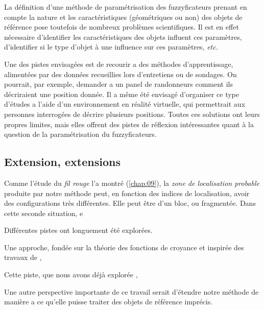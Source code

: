 La définition d'une méthode de paramétrisation des fuzzyficateurs
prenant en compte la nature et les caractéristiques (géométriques ou
non) des objets de référence pose toutefois de nombreux problèmes
scientifiques. Il est en effet nécessaire d'identifier les
caractéristiques des objets influent ces paramètres, d'identifier si
le type d'objet à une influence sur ces paramètres, \emph{etc.}

Une des pistes envisagées est de recourir a des méthodes
d'apprentissage, alimentées par des données recueillies lors
d'entretiens ou de sondages. On pourrait, par exemple, demander a un
panel de randonneurs comment ils décriraient une position donnée. Il a
même été envisagé d'organiser ce type d'études a l'aide d'un
environnement en réalité virtuelle, qui permettrait aux personnes
interrogées de décrire plusieurs positions. Toutes ces solutions ont
leurs propres limites, mais elles offrent des pistes de réflexion
intéressantes quant à la question de la paramétrisation du
fuzzyficateurs.

\subsection*{Extension, extensions}


Comme l'étude du \emph{fil rouge} l'a montré (\autoref{chap:09}), la
\emph{zone de localisation probable} produite par notre méthode peut,
en fonction des indices de localisation, avoir des configurations très
différentes. Elle peut être d'un bloc, ou fragmentée. Dans cette
seconde situation,  e


Différentes pistes ont longuement été explorées.

Une approche, fondée sur la théorie des fonctions de croyance
\autocite{Shafer1976} et inspirée des travaux de
\textcite{Olteanu2008},



Cette piste, que nous avons déjà explorée \autocite{Bunel2019a},





Une autre perspective importante de ce travail serait d'étendre notre
méthode de manière a ce qu'elle puisse traiter des objets de référence
imprécis.

